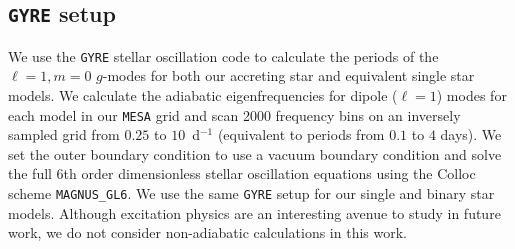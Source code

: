 \documentclass[twocolumn, twocolappendix, oneside]{aastex631}
\makeatletter
\newcommand{\unit}[1]{%
    \,\mathrm{#1}\checknextarg}
\newcommand{\checknextarg}{\@ifnextchar\bgroup{\gobblenextarg}{}}
\newcommand{\gobblenextarg}[1]{\,\mathrm{#1}\@ifnextchar\bgroup{\gobblenextarg}{}}
\newcommand{\gmodes}{$g$-modes\xspace}
\newcommand{\mesa}{\texttt{MESA}\xspace}
\newcommand{\gyre}{\texttt{GYRE}\xspace}
\newif\ifstartedinmathmode
\newcommand{\msun}{%
  \relax\ifmmode\startedinmathmodetrue\else\startedinmathmodefalse\fi
  {\ifstartedinmathmode\unit{M_{\odot}}\else$\unit{M_{\odot}}$\fi}\xspace%
}
\newif\ifstartedinmathmode
\makeatother
\begin{document}



\subsection{\gyre setup} \label{sec: gyre_setup}

We use the \gyre stellar oscillation code \citep[version 7.1, ][]{Townsend+2013,Townsend+2018,Goldstein+2020,Sun+2023} to calculate the periods of the ${\ell = 1}, {m = 0}$ \gmodes for both our accreting star and equivalent single star models. We calculate the adiabatic eigenfrequencies for dipole ($\ell=1$) modes for each model in our \mesa grid and scan 2000 frequency bins on an inversely sampled grid from $0.25$ to $10$~d$^{-1}$ (equivalent to periods from $0.1$ to $4$ days). We set the outer boundary condition to use a vacuum boundary condition and solve the full 6th order dimensionless stellar oscillation equations \citep{Dziembowski+1971, Christensen-Dalsgaard+2008} using the Colloc scheme \texttt{MAGNUS\_GL6}. We use the same \gyre setup for our single and binary star models. Although excitation physics are an interesting avenue to study in future work, we do not consider non-adiabatic calculations in this work.
\end{document}
